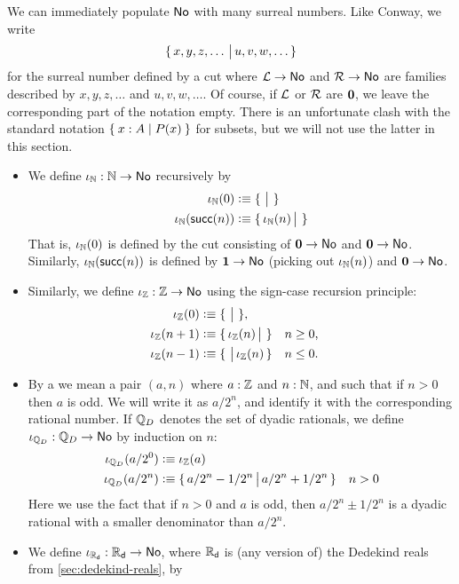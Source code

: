 We can immediately populate $\mathsf{No}$ with many surreal numbers.
Like Conway, we write
\[\{\,x,y,z,\dots\,\big|\,u,v,w,\dots\,\}\]
for the surreal number defined by a cut where $\mathcal{L}\to\mathsf{No}$ and $\mathcal{R}\to\mathsf{No}$ are families described by $x,y,z,\dots$ and $u,v,w,\dots$.
Of course, if $\mathcal{L}$ or $\mathcal{R}$ are $\mathbf{0}$, we leave the corresponding part of the notation empty.
There is an unfortunate clash with the standard notation $\Set{x:A | P(x)}$ for subsets, but we will not use the latter in this section.
\begin{itemize}
\item We define $\iota_{\mathbb{N}}:\mathbb{N}\to\mathsf{No}$ recursively by
  \begin{align*}
    \iota_{\mathbb{N}}(0) &\vcentcolon\equiv \{\,\,\big|\,\,\}\\
    \iota_\mathbb{N}(\mathsf{succ}(n)) &\vcentcolon\equiv \{\,\iota_\mathbb{N}(n)\,\big|\,\,\}
  \end{align*}
  That is, $\iota_\mathbb{N}(0)$ is defined by the cut consisting of $\mathbf{0}\to\mathsf{No}$ and $\mathbf{0}\to\mathsf{No}$.
  Similarly, $\iota_\mathbb{N}(\mathsf{succ}(n))$ is defined by $\mathbf{1}\to\mathsf{No}$ (picking out $\iota_\mathbb{N}(n)$) and $\mathbf{0}\to\mathsf{No}$.
\item Similarly, we define $\iota_{\mathbb{Z}}:\mathbb{Z}\to\mathsf{No}$ using the sign-case recursion principle:
  \begin{align*}
    \iota_{\mathbb{Z}}(0) &\vcentcolon\equiv \{\,\,\big|\,\,\},\\
    \iota_\mathbb{Z}(n+1) &\vcentcolon\equiv \{\,\iota_\mathbb{Z}(n)\,\big|\,\,\} & &\text{$n\ge 0$,}\\
    \iota_\mathbb{Z}(n-1) &\vcentcolon\equiv \{\,\,\big|\,\iota_\mathbb{Z}(n)\,\} & &\text{$n\le 0$.}
  \end{align*}
\item By a 
  we mean a pair $(a,n)$ where $a:\mathbb{Z}$ and $n:\mathbb{N}$, and such that if $n>0$ then $a$ is odd.
  We will write it as $a/2^n$, and identify it with the corresponding rational number.
  If $\mathbb{Q}_D$ denotes the set of dyadic rationals, we define $\iota_{\mathbb{Q}_D}:\mathbb{Q}_D\to\mathsf{No}$ by induction on $n$:
  \begin{align*}
    \iota_{\mathbb{Q}_D}(a/2^0) &\vcentcolon\equiv \iota_\mathbb{Z}(a)\\
    \iota_{\mathbb{Q}_D}(a/2^n) &\vcentcolon\equiv \{\,a/2^n - 1/2^n\,\big|\,a/2^n + 1/2^n\,\} \quad n>0
  \end{align*}
  Here we use the fact that if $n>0$ and $a$ is odd, then $a/2^n \pm 1/2^n$ is a dyadic rational with a smaller denominator than $a/2^n$.
\item We define $\iota_{\mathbb{R}_\mathsf{d}}:\mathbb{R}_\mathsf{d}\to\mathsf{No}$, where $\mathbb{R}_\mathsf{d}$ is (any version of) the Dedekind reals from \autoref{sec:dedekind-reals}, by

\end{itemize}
